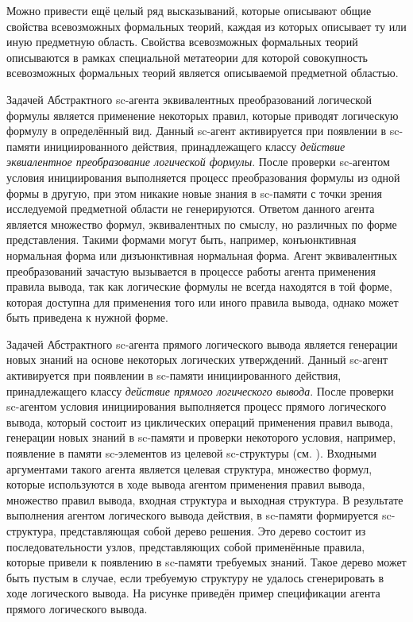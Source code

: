 Можно привести ещё целый ряд высказываний, которые описывают общие свойства всевозможных формальных теорий, каждая из которых описывает ту или иную предметную область. Свойства всевозможных формальных теорий описываются в рамках специальной метатеории для которой совокупность всевозможных формальных теорий является описываемой предметной областью.

Задачей Абстрактного sc-агента эквивалентных преобразований логической формулы является применение некоторых правил, которые приводят логическую формулу в определённый вид. Данный sc-агент активируется при появлении в sc-памяти инициированного действия, принадлежащего классу \textit{действие эквиалентное преобразование логической формулы}. После проверки sc-агентом условия инициирования выполняется процесс преобразования формулы из одной формы в другую, при этом никакие новые знания в sc-памяти с точки зрения исследуемой предметной области не генерируются. Ответом данного агента является множество формул, эквивалентных по смыслу, но различных по форме представления. Такими формами могут быть, например, конъюнктивная нормальная форма или дизъюнктивная нормальная форма. Агент эквивалентных преобразований зачастую вызывается в процессе работы агента применения правила вывода, так как логические формулы не всегда находятся в той форме, которая доступна для применения того или иного правила вывода, однако может быть приведена к нужной форме.

Задачей Абстрактного sc-агента прямого логического вывода является генерации новых знаний на основе некоторых логических утверждений. Данный sc-агент активируется при появлении в sc-памяти инициированного действия, принадлежащего классу \textit{действие прямого логического вывода}. После проверки sc-агентом условия инициирования выполняется процесс прямого логического вывода, который состоит из циклических операций применения правил вывода, генерации новых знаний в sc-памяти и проверки некоторого условия, например, появление в памяти sc-элементов из целевой sc-структуры (см. ). Входными аргументами такого агента является целевая структура, множество формул, которые используются в ходе вывода агентом применения правил вывода, множество правил вывода, входная структура и выходная структура. В результате выполнения агентом логического вывода действия, в sc-памяти формируется sc-структура, представляющая собой дерево решения. Это дерево состоит из последовательности узлов, представляющих собой применённые правила, которые привели к появлению в sc-памяти требуемых знаний. Такое дерево может быть пустым в случае, если требуемую структуру не удалось сгенерировать в ходе логического вывода. На рисунке  приведён пример спецификации агента прямого логического вывода.

